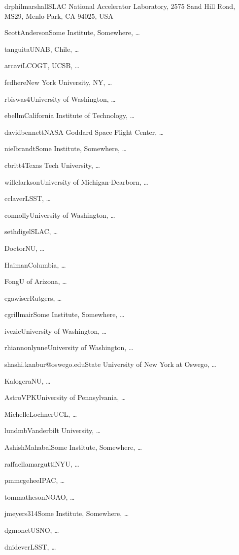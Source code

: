 
\vspace{4\baselineskip}


\vspace{\baselineskip}

\author{Phil Marshall}{drphilmarshall}{SLAC National Accelerator Laboratory, 2575 Sand Hill Road, MS29, Menlo Park, CA 94025, USA}
\author{Scott Anderson}{ScottAnderson}{Some Institute, Somewhere, \ldots}
\author{Timo Anguita}{tanguita}{UNAB, Chile, \ldots}
\author{Iair Arcavi}{arcavi}{LCOGT, UCSB, \ldots}
\author{Federica B. Bianco}{fedhere}{New York University, NY, \ldots}
\author{Rahul Biswas}{rbiswas4}{University of Washington, \ldots}
\author{Eric C.\ Bellm}{ebellm}{California Institute of Technology, \ldots}
\author{David Bennett}{davidbennett}{NASA Goddard Space Flight Center, \ldots}
\author{Niel Brandt}{nielbrandt}{Some Institute, Somewhere, \ldots}
\author{Chris Britt}{cbritt4}{Texas Tech University, \ldots}
\author{Will Clarkson}{willclarkson}{University of Michigan-Dearborn, \ldots}
\author{Chuck Claver}{cclaver}{LSST, \ldots}
\author{Andy Connolly}{connolly}{University of Washington, \ldots}
\author{Seth Digel}{sethdigel}{SLAC, \ldots}
\author{Zoheyr Doctor}{Doctor}{NU, \ldots}
\author{Zoltan Haiman}{Haiman}{Columbia, \ldots}
\author{Wen-fai Fong}{Fong}{U of Arizona, \ldots}
\author{Eric Gawiser}{egawiser}{Rutgers, \ldots}
\author{Carl Grillmair}{cgrillmair}{Some Institute, Somewhere, \ldots}
\author{\v{Z}eljko Ivezi\'{c}}{ivezic}{University of Washington, \ldots}
\author{Lynne Jones}{rhiannonlynne}{University of Washington, \ldots}
\author{Shashi Kanbur}{shashi.kanbur@oswego.edu}{State University of New York at Oswego, \dots}
\author{Vassiliki Kalogera}{Kalogera}{NU, \ldots}
\author{Vishal Kasliwal}{AstroVPK}{University of Pennsylvania, \ldots}
\author{Michelle Lochner}{MichelleLochner}{UCL, \ldots}
\author{Michael B.\ Lund}{lundmb}{Vanderbilt University, \ldots}
\author{Ashish Mahabal}{AshishMahabal}{Some Institute, Somewhere, \ldots}
\author{Raffaella Margutti}{raffaellamargutti}{NYU, \ldots}
\author{Peregrine McGehee}{pmmcgehee}{IPAC, \ldots}
\author{Tom Matheson}{tommatheson}{NOAO, \ldots}
\author{Josh Meyers}{jmeyers314}{Some Institute, Somewhere, \ldots}
\author{Dave Monet}{dgmonet}{USNO, \ldots}
\author{David Nidever}{dnidever}{LSST, \ldots}
